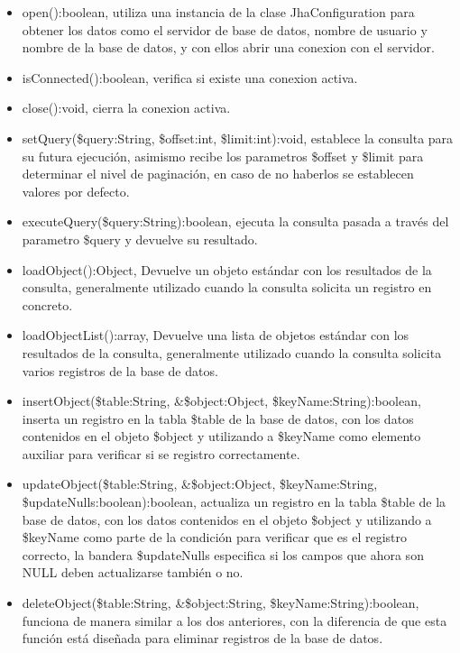 \begin{itemize}
\item \textsf{open():boolean}, utiliza una instancia de la clase \textsf{JhaConfiguration} para obtener los datos como el servidor de base de datos, nombre de usuario y nombre de la base de datos, y con ellos abrir una conexion con el servidor.
\item \textsf{isConnected():boolean}, verifica si existe una conexion activa.
\item \textsf{close():void}, cierra la conexion activa.
\item \textsf{setQuery(\$query:String, \$offset:int, \$limit:int):void}, establece la consulta para su futura ejecuci\'on, asimismo recibe los parametros \textsf{\$offset} y \textsf{\$limit} para determinar el nivel de paginaci\'on, en caso de no haberlos se establecen valores por defecto.
\item \textsf{executeQuery(\$query:String):boolean}, ejecuta la consulta pasada a trav\'es del parametro \textsf{\$query} y devuelve su resultado.
\item \textsf{loadObject():Object}, Devuelve un objeto est\'andar con los resultados de la consulta, generalmente utilizado cuando la consulta solicita un registro en concreto.
\item \textsf{loadObjectList():array}, Devuelve una lista de objetos est\'andar con los resultados de la consulta, generalmente utilizado cuando la consulta solicita varios registros de la base de datos.
\item \textsf{insertObject(\$table:String, \&\$object:Object, \$keyName:String):boolean}, inserta un registro en la tabla \textsf{\$table} de la base de datos, con los datos contenidos en el objeto \textsf{\$object} y utilizando a \textsf{\$keyName} como elemento auxiliar para verificar si se registro correctamente.
\item \textsf{updateObject(\$table:String, \&\$object:Object, \$keyName:String, \$updateNulls:boolean):boolean}, actualiza un registro en la tabla \textsf{\$table} de la base de datos, con los datos contenidos en el objeto \textsf{\$object} y utilizando a \textsf{\$keyName} como parte de la condici\'on para verificar que es el registro correcto, la bandera \textsf{\$updateNulls} especifica si los campos que ahora son NULL deben actualizarse tambi\'en o no.
\item \textsf{deleteObject(\$table:String, \&\$object:String, \$keyName:String):boolean}, funciona de manera similar a los dos anteriores, con la diferencia de que esta funci\'on est\'a dise\~nada para eliminar registros de la base de datos.
\end{itemize}

